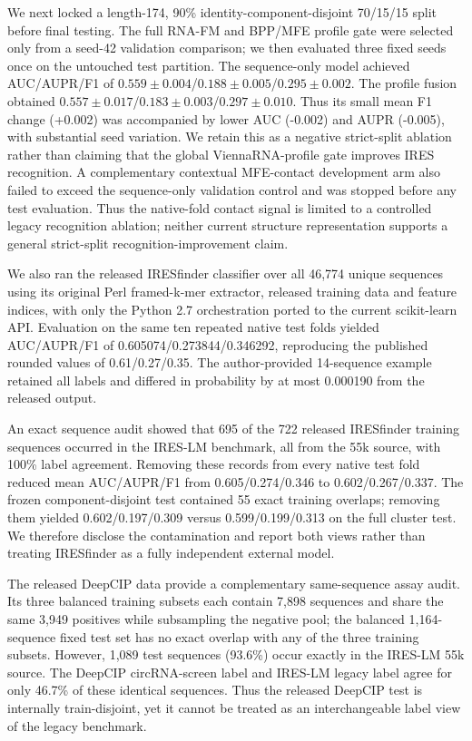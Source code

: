 We next locked a length-174, 90\% identity-component-disjoint 70/15/15 split before final testing.
The full RNA-FM and BPP/MFE profile gate were selected only from a seed-42 validation comparison;
we then evaluated three fixed seeds once on the untouched test partition.  The sequence-only model
achieved AUC/AUPR/F1 of $0.559\pm0.004$/$0.188\pm0.005$/$0.295\pm0.002$.  The profile fusion
obtained $0.557\pm0.017$/$0.183\pm0.003$/$0.297\pm0.010$.  Thus its small mean F1 change
(+0.002) was accompanied by lower AUC (-0.002) and AUPR (-0.005), with substantial seed variation.
We retain this as a negative strict-split ablation rather than claiming that the global
ViennaRNA-profile gate improves IRES recognition. A complementary contextual MFE-contact
development arm also failed to exceed the sequence-only validation control and was stopped before
any test evaluation. Thus the native-fold contact signal is limited to a controlled legacy
recognition ablation; neither current structure representation supports a general strict-split
recognition-improvement claim.

We also ran the released IRESfinder classifier over all 46,774 unique sequences using its original
Perl framed-k-mer extractor, released training data and feature indices, with only the Python 2.7
orchestration ported to the current scikit-learn API. Evaluation on the same ten repeated native
test folds yielded AUC/AUPR/F1 of 0.605074/0.273844/0.346292, reproducing the published rounded
values of 0.61/0.27/0.35. The author-provided 14-sequence example retained all labels and differed
in probability by at most 0.000190 from the released output.

An exact sequence audit showed that 695 of the 722 released IRESfinder training sequences occurred
in the IRES-LM benchmark, all from the 55k source, with 100\% label agreement. Removing these records
from every native test fold reduced mean AUC/AUPR/F1 from 0.605/0.274/0.346 to
0.602/0.267/0.337. The frozen component-disjoint test contained 55 exact training overlaps;
removing them yielded 0.602/0.197/0.309 versus 0.599/0.199/0.313 on the full cluster test. We
therefore disclose the contamination and report both views rather than treating IRESfinder as a
fully independent external model.

The released DeepCIP data provide a complementary same-sequence assay audit. Its three balanced
training subsets each contain 7,898 sequences and share the same 3,949 positives while subsampling
the negative pool; the balanced 1,164-sequence fixed test set has no exact overlap with any of the
three training subsets. However, 1,089 test sequences (93.6\%) occur exactly in the IRES-LM 55k
source. The DeepCIP circRNA-screen label and IRES-LM legacy label agree for only 46.7\% of these
identical sequences. Thus the released DeepCIP test is internally train-disjoint, yet it cannot be
treated as an interchangeable label view of the legacy benchmark.

